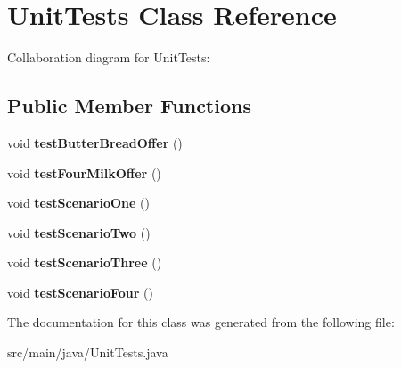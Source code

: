 \hypertarget{classUnitTests}{}\section{Unit\+Tests Class Reference}
\label{classUnitTests}


Collaboration diagram for Unit\+Tests\+:
\subsection*{Public Member Functions}
\begin{DoxyCompactItemize}
\item 
\hypertarget{classUnitTests_acafbe55bad8e7d553d0fcc523941c595}{}void {\bfseries test\+Butter\+Bread\+Offer} ()\label{classUnitTests_acafbe55bad8e7d553d0fcc523941c595}

\item 
\hypertarget{classUnitTests_ab477b4af8e09043241817cb8d45ec987}{}void {\bfseries test\+Four\+Milk\+Offer} ()\label{classUnitTests_ab477b4af8e09043241817cb8d45ec987}

\item 
\hypertarget{classUnitTests_a51fdc2f61f5ebe46a6fa77f2779f8de2}{}void {\bfseries test\+Scenario\+One} ()\label{classUnitTests_a51fdc2f61f5ebe46a6fa77f2779f8de2}

\item 
\hypertarget{classUnitTests_a5b5b8160dd54b377416d0c79b506ae3b}{}void {\bfseries test\+Scenario\+Two} ()\label{classUnitTests_a5b5b8160dd54b377416d0c79b506ae3b}

\item 
\hypertarget{classUnitTests_a51768446c14f27d568b7027de77a75a6}{}void {\bfseries test\+Scenario\+Three} ()\label{classUnitTests_a51768446c14f27d568b7027de77a75a6}

\item 
\hypertarget{classUnitTests_abed0af5d7dad7c8d9538123505547389}{}void {\bfseries test\+Scenario\+Four} ()\label{classUnitTests_abed0af5d7dad7c8d9538123505547389}

\end{DoxyCompactItemize}


The documentation for this class was generated from the following file\+:\begin{DoxyCompactItemize}
\item 
src/main/java/Unit\+Tests.\+java\end{DoxyCompactItemize}
